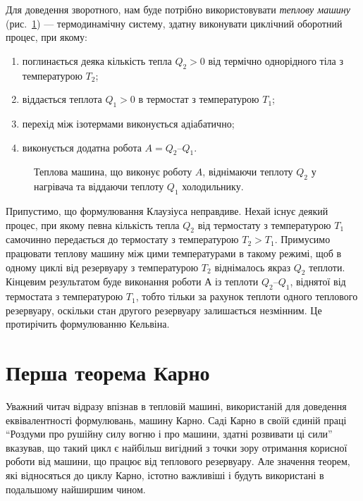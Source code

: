 Для доведення зворотного, нам буде потрібно використовувати \emph{теплову машину}
(рис.~\ref{pic:3.1}) --- термодинамічну систему, здатну виконувати циклічний оборотний
процес, при якому:
\begin{enumerate}
	\item [а)] поглинається деяка кількість тепла $Q_2>0$ від термічно однорідного тіла з температурою
	$T_2$;
	\item [б)] віддається теплота $Q_1>0$ в термостат з температурою $T_1$;
	\item [в)] перехід між ізотермами виконується адіабатично;
	\item [г)] виконується додатна робота $A = Q_2 – Q_1$.
\end{enumerate}

\begin{figure}[h!]\centering
    
	\caption{Теплова машина, що виконує роботу $A$, віднімаючи теплоту $Q_2$ у нагрівача та віддаючи
	теплоту
		$Q_1$ холодильнику.}
	\label{pic:3.1}
\end{figure}

Припустимо, що формулювання Клаузіуса неправдиве. Нехай існує деякий процес, при якому певна кількість тепла $Q_2$ від термостату з температурою $T_1$ самочинно передається до термостату з температурою $T_2>T_1$. Примусимо працювати теплову машину між цими температурами в такому режимі, щоб в одному циклі від резервуару з температурою $T_2$ віднімалось якраз $Q_2$ теплоти. Кінцевим результатом буде виконання роботи $А$ із теплоти $Q_2 – Q_1$, віднятої від термостата з температурою $T_1$, тобто тільки за рахунок теплоти одного теплового резервуару, оскільки стан другого резервуару залишається незмінним. Це протирічить формулюванню Кельвіна.

\section{Перша теорема Карно}

Уважний читач відразу впізнав в тепловій машині, використаній для доведення еквівалентності
формулювань, машину Карно. Саді Карно в своїй єдиній праці \enquote{Роздуми про рушійну силу вогню і
	про машини, здатні розвивати ці сили} вказував, що такий цикл є найбільш вигідний з точки зору
отримання корисної роботи від машини, що працює від теплового резервуару. Але значення теорем, які
відносяться до циклу Карно, істотно важливіші і будуть використані в подальшому найширшим чином.

